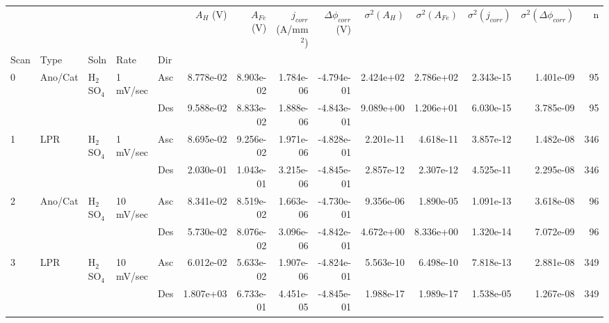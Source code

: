 \begin{tabular}{lllllrrrrrrrrr}
\toprule
  &     &     &           &     &  $A_H$ (V) &  $A_{Fe}$ (V) &  $j_{corr}$ (A/mm$^2$) &  $\Delta \phi_{corr}$ (V) &  $\sigma^2(A_H)$ &  $\sigma^2(A_{Fe})$ &  $\sigma^2(j_{corr})$ &  $\sigma^2(\Delta \phi_{corr})$ &    n \\
Scan & Type & Soln & Rate & Dir &            &               &                        &                           &                  &                     &                       &                                 &      \\
\midrule
0 & Ano/Cat & H$_2$SO$_4$ & 1 mV/sec & Asc &  8.778e-02 &     8.903e-02 &              1.784e-06 &                -4.794e-01 &        2.424e+02 &           2.786e+02 &             2.343e-15 &                       1.401e-09 &   95 \\
  &     &     &           & Des &  9.588e-02 &     8.833e-02 &              1.888e-06 &                -4.843e-01 &        9.089e+00 &           1.206e+01 &             6.030e-15 &                       3.785e-09 &   95 \\
1 & LPR & H$_2$SO$_4$ & 1 mV/sec & Asc &  8.695e-02 &     9.256e-02 &              1.971e-06 &                -4.828e-01 &        2.201e-11 &           4.618e-11 &             3.857e-12 &                       1.482e-08 &  346 \\
  &     &     &           & Des &  2.030e-01 &     1.043e-01 &              3.215e-06 &                -4.845e-01 &        2.857e-12 &           2.307e-12 &             4.525e-11 &                       2.295e-08 &  346 \\
2 & Ano/Cat & H$_2$SO$_4$ & 10 mV/sec & Asc &  8.341e-02 &     8.519e-02 &              1.663e-06 &                -4.730e-01 &        9.356e-06 &           1.890e-05 &             1.091e-13 &                       3.618e-08 &   96 \\
  &     &     &           & Des &  5.730e-02 &     8.076e-02 &              3.096e-06 &                -4.842e-01 &        4.672e+00 &           8.336e+00 &             1.320e-14 &                       7.072e-09 &   96 \\
3 & LPR & H$_2$SO$_4$ & 10 mV/sec & Asc &  6.012e-02 &     5.633e-02 &              1.907e-06 &                -4.824e-01 &        5.563e-10 &           6.498e-10 &             7.818e-13 &                       2.881e-08 &  349 \\
  &     &     &           & Des &  1.807e+03 &     6.733e-01 &              4.451e-05 &                -4.845e-01 &        1.988e-17 &           1.989e-17 &             1.538e-05 &                       1.267e-08 &  349 \\

\end{tabular}
